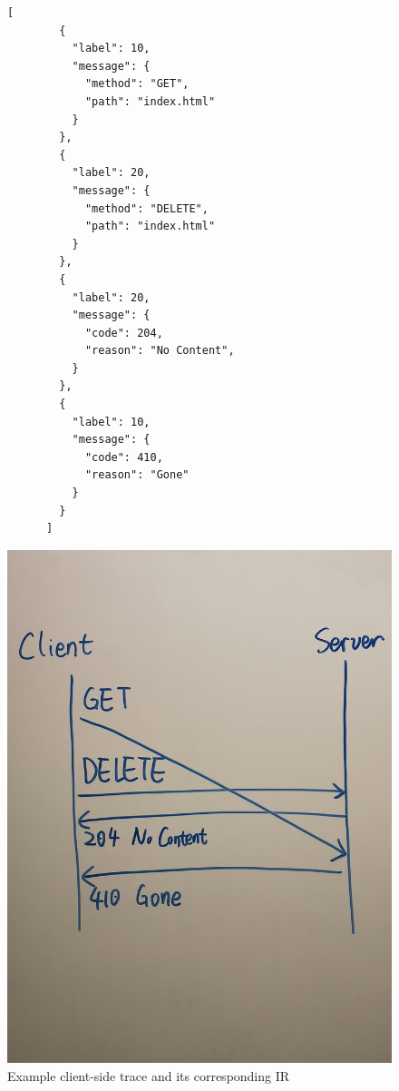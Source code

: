 \documentclass{article}
\theoremstyle{definition}
\begin{document}
\begin{figure}
  \begin{minipage}{.5\textwidth}
    \begin{lstlisting}[style=json]
      [
        {
          "label": 10,
          "message": {
            "method": "GET",
            "path": "index.html"
          }
        },
        {
          "label": 20,
          "message": {
            "method": "DELETE",
            "path": "index.html"
          }
        },
        {
          "label": 20,
          "message": {
            "code": 204,
            "reason": "No Content",
          }
        },
        {
          "label": 10,
          "message": {
            "code": 410,
            "reason": "Gone"
          }
        }
      ]
    \end{lstlisting}
  \end{minipage}%
  \begin{minipage}{.5\textwidth}
    \includegraphics[width=\textwidth]{figures/trace}
  \end{minipage}
  \caption{Example client-side trace and its corresponding IR}
  \label{fig:trace}
\end{figure}
\end{document}
